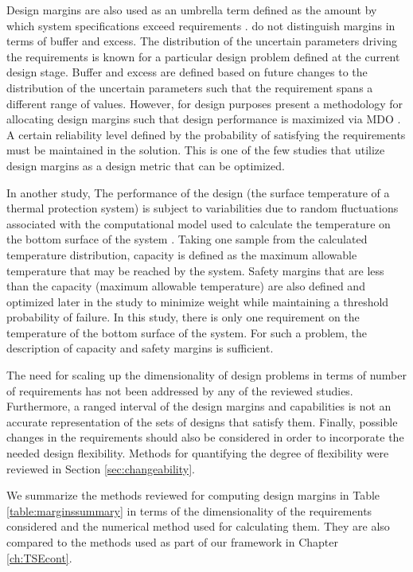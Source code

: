 Design margins are also used as an umbrella term defined as the amount by which system specifications exceed requirements \cite{Cross2015}. \citeauthor{Cross2015} do not distinguish margins in terms of buffer and excess. The distribution of the uncertain parameters driving the requirements is known for a particular design problem defined at the current design stage. Buffer and excess are defined based on future changes to the distribution of the uncertain parameters such that the requirement spans a different range of values. However, for design purposes \citeauthor{Cross2015} present a methodology for allocating design margins such that design performance is maximized via \ac{MDO} \cite{Cross2015}. A certain reliability level defined by the probability of satisfying the requirements must be maintained in the solution. This is one of the few studies that utilize design margins as a design metric that can be optimized. 

In another study, The performance of the design (the surface temperature of a thermal protection system) is subject to variabilities due to random fluctuations associated with the computational model used to calculate the temperature on the bottom surface of the system \cite{Villanueva2014}. Taking one sample from the calculated temperature distribution, capacity is defined as the maximum allowable temperature that may be reached by the system. Safety margins that are less than the capacity (maximum allowable temperature) are also defined and optimized later in the study to minimize weight while maintaining a threshold probability of failure. In this study, there is only one requirement on the temperature of the bottom surface of the system. For such a problem, the description of capacity and safety margins is sufficient. 

The need for scaling up the dimensionality of design problems in terms of number of requirements has not been addressed by any of the reviewed studies. Furthermore, a ranged interval of the design margins and capabilities is not an accurate representation of the sets of designs that satisfy them. Finally, possible changes in the requirements should also be considered in order to incorporate the needed design flexibility. Methods for quantifying the degree of flexibility were reviewed in Section \ref{sec:changeability}.

We summarize the methods reviewed for computing design margins in Table \ref{table:marginssummary} in terms of the dimensionality of the requirements considered and the numerical method used for calculating them. They are also compared to the methods used as part of our framework in Chapter \ref{ch:TSEcont}.

